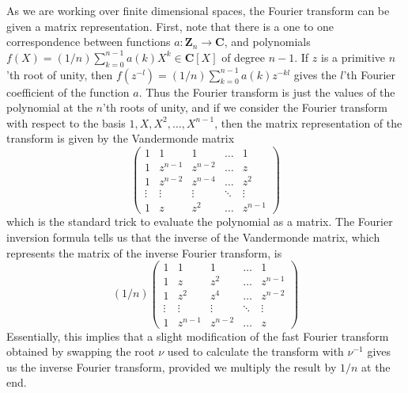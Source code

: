 As we are working over finite dimensional spaces, the Fourier transform can be given a matrix representation. First, note that there is a one to one correspondence between functions $a: \mathbf{Z}_n \to \mathbf{C}$, and polynomials $f(X) = (1/n) \sum_{k = 0}^{n-1} a(k) X^k \in \mathbf{C}[X]$ of degree $n-1$. If $z$ is a primitive $n$'th root of unity, then $f(z^{-l}) = (1/n) \sum_{k = 0}^{n-1} a(k) z^{-kl}$ gives the $l$'th Fourier coefficient of the function $a$. Thus the Fourier transform is just the values of the polynomial at the $n$'th roots of unity, and if we consider the Fourier transform with respect to the basis $1, X, X^2, \dots, X^{n-1}$, then the matrix representation of the transform is given by the Vandermonde matrix
%
\[ \begin{pmatrix} 1 & 1 & 1 & \dots & 1 \\ 1 & z^{n-1} & z^{n-2} & \dots & z \\ 1 & z^{n-2} & z^{n-4} & \dots & z^2 \\ \vdots & \vdots & \vdots & \ddots & \vdots \\ 1 & z & z^2 & \dots & z^{n-1} \end{pmatrix} \]
%
which is the standard trick to evaluate the polynomial as a matrix. The Fourier inversion formula tells us that the inverse of the Vandermonde matrix, which represents the matrix of the inverse Fourier transform, is
%
\[ (1/n) \begin{pmatrix} 1 & 1 & 1 & \dots & 1 \\ 1 & z & z^2 & \dots & z^{n-1} \\ 1 & z^2 & z^4 & \dots & z^{n-2} \\ \vdots & \vdots & \vdots & \ddots & \vdots \\ 1 & z^{n-1} & z^{n-2} & \dots & z \end{pmatrix} \]
%
Essentially, this implies that a slight modification of the fast Fourier transform obtained by swapping the root $\nu$ used to calculate the transform with $\nu^{-1}$ gives us the inverse Fourier transform, provided we multiply the result by $1/n$ at the end.

